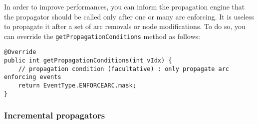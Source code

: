 \documentclass{article}
\begin{document}
In order to improve performances, you can inform the propagation engine that the propagator should be called only after one or many arc enforcing. It is useless to propagate it after a set of arc removals or node modifications. 
To do so, you can override the \texttt{getPropagationConditions} method as follows:
\begin{lstlisting}
@Override
public int getPropagationConditions(int vIdx) {
	// propagation condition (facultative) : only propagate arc enforcing events
	return EventType.ENFORCEARC.mask;
}
\end{lstlisting}

\subsubsection{Incremental propagators}
\end{document}
